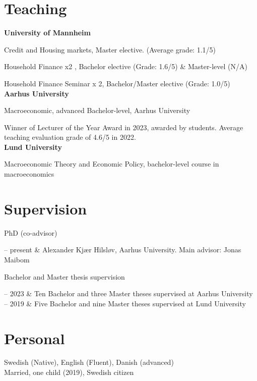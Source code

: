 \documentclass[11pt, a4paper]{article}
\newcommand{\AU}{Aarhus University}
\newcommand{\Duration}[2]{\fontsize{10pt}{0}\selectfont #1 -- #2}
\newcommand{\Ongoing}{present}
\begin{document}
\section{Teaching}

\textbf{University of Mannheim}

Credit and Housing markets, Master elective. (Average grade: 1.1/5) 

Household Finance x2 , Bachelor elective (Grade: 1.6/5) \& Master-level (N/A)

Household Finance Seminar x 2, Bachelor/Master elective (Grade: 1.0/5) \\


\textbf{Aarhus University}

Macroeconomic, advanced Bachelor-level, Aarhus University

Winner of Lecturer of the Year Award in 2023, awarded by students. Average teaching evaluation grade of 4.6/5 in 2022. \\


\textbf{Lund University}

Macroeconomic Theory and Economic Policy, bachelor-level course in macroeconomics

\section{Supervision}
P\lowercase{h}D \lowercase{(co-advisor)}
\begin{EntriesTable}
	\Duration{2022}{\Ongoing}  & Alexander Kjær Hilsløv, \AU. Main advisor: Jonas Maibom
\end{EntriesTable}

Bachelor and Master thesis supervision
\begin{EntriesTable}
	\Duration{2020}{2023}  &
	Ten Bachelor and three Master theses supervised at \AU \\ 
	\Duration{2017}{2019}   & Five Bachelor and nine Master theses supervised at Lund University
	
\end{EntriesTable}

	
\section{Personal}
Swedish (Native), English (Fluent), Danish (advanced) \\ 
Married, one child (2019), Swedish citizen
\end{document}
